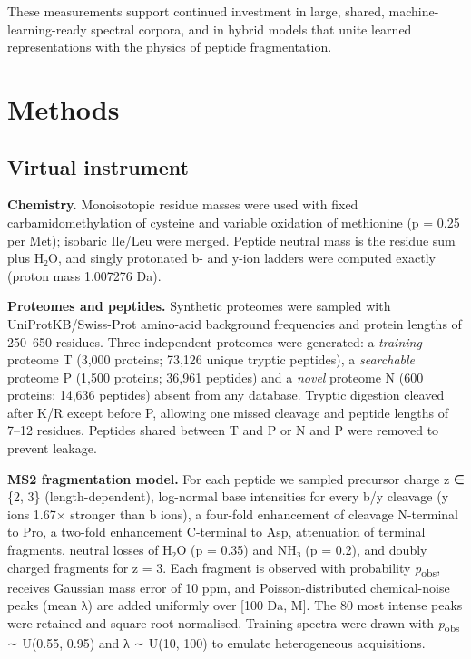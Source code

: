 \documentclass{sn-preview}
\begin{document}
These measurements support continued investment in large, shared, machine-learning-ready spectral corpora, and in hybrid models that unite learned representations with the physics of peptide fragmentation.

\section{Methods}\label{sec:methods}
\subsection{Virtual instrument}

\textbf{Chemistry.} Monoisotopic residue masses were used with fixed carbamidomethylation of cysteine and variable oxidation of methionine (p = 0.25 per Met); isobaric Ile/Leu were merged. Peptide neutral mass is the residue sum plus H₂O, and singly protonated b- and y-ion ladders were computed exactly (proton mass 1.007276 Da).

\textbf{Proteomes and peptides.} Synthetic proteomes were sampled with UniProtKB/Swiss-Prot amino-acid background frequencies and protein lengths of 250--650 residues. Three independent proteomes were generated: a \emph{training} proteome T (3,000 proteins; 73,126 unique tryptic peptides), a \emph{searchable} proteome P (1,500 proteins; 36,961 peptides) and a \emph{novel} proteome N (600 proteins; 14,636 peptides) absent from any database. Tryptic digestion cleaved after K/R except before P, allowing one missed cleavage and peptide lengths of 7--12 residues. Peptides shared between T and P or N and P were removed to prevent leakage.

\textbf{MS2 fragmentation model.} For each peptide we sampled precursor charge z ∈ \{2, 3\} (length-dependent), log-normal base intensities for every b/y cleavage (y ions 1.67× stronger than b ions), a four-fold enhancement of cleavage N-terminal to Pro, a two-fold enhancement C-terminal to Asp, attenuation of terminal fragments, neutral losses of H₂O (p = 0.35) and NH₃ (p = 0.2), and doubly charged fragments for z = 3. Each fragment is observed with probability \emph{p}\textsubscript{obs}, receives Gaussian mass error of 10 ppm, and Poisson-distributed chemical-noise peaks (mean λ) are added uniformly over {[}100 Da, M{]}. The 80 most intense peaks were retained and square-root-normalised. Training spectra were drawn with \emph{p}\textsubscript{obs} ∼ U(0.55, 0.95) and λ ∼ U(10, 100) to emulate heterogeneous acquisitions.
\end{document}
